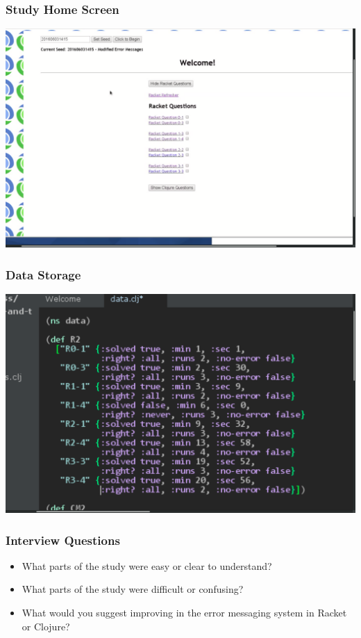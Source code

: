 \documentclass{beamer}
\begin{document}
\begin{frame}
  \frametitle{Study Home Screen}
  \includegraphics[scale=.17]{StudyHomeScreen}
\end{frame}

\begin{frame}
  \frametitle{Data Storage}
  \includegraphics[scale=.17]{DataShot2}
\end{frame}

\begin{frame}
  \frametitle{Interview Questions}
 \begin{itemize}
 
\item What parts of the study were easy or clear to understand?
\item What parts of the study were difficult or confusing?
\item What would you suggest improving in the error messaging system in Racket or Clojure? 
 
 \end{itemize}
\end{frame}  
\end{document}
